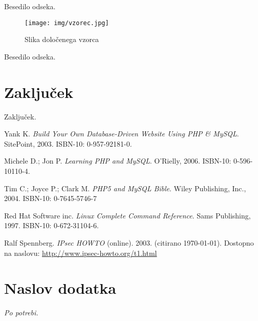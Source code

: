 \documentclass[a4paper,12pt]{report}
\begin{document}
Besedilo odseka.

\begin{figure}[htb]
	\centering
	\texttt{[image: img/vzorec.jpg]}
	\caption{Slika določenega vzorca}
\label{fig:1}
\end{figure}

Besedilo odseka.

\chapter{Zaključek}

Zaključek.

\begin{thebibliography}{99}
\addtocounter{chapter}{1}

 Yank K. \emph{Build Your Own Database-Driven Website Using PHP \& MySQL}. SitePoint, 2003. ISBN-10: 0-957-92181-0.

 Michele D.; Jon P. \emph{Learning PHP and MySQL}. O'Rielly, 2006. ISBN-10: 0-596-10110-4.

 Tim C.; Joyce P.; Clark M. \emph{PHP5 and MySQL Bible}. Wiley Publishing, Inc., 2004. ISBN-10: 0-7645-5746-7

 Red Hat Software inc. \emph{Linux Complete Command Reference}. Sams Publishing, 1997. ISBN-10: 0-672-31104-6.

 Ralf Spennberg. \emph{IPsec HOWTO} (online). 2003. (citirano \today). Dostopno na naslovu:
\url{http://www.ipsec-howto.org/t1.html}

\end{thebibliography}


 \appendix

\chapter{Naslov dodatka}
{\it Po potrebi.}
\end{document}
